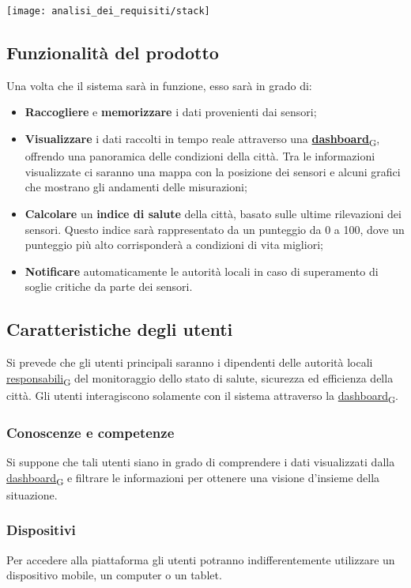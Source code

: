 \begin{center}
	\texttt{[image: analisi\_dei\_requisiti/stack]}
\end{center}

\subsection{Funzionalità del prodotto}
Una volta che il sistema sarà in funzione, esso sarà in grado di:
\begin{itemize}
	\item \textbf{Raccogliere} e \textbf{memorizzare} i dati provenienti dai sensori;
	\item \textbf{Visualizzare} i dati raccolti in tempo reale attraverso una \href{https://7last.github.io/docs/rtb/documentazione-interna/glossario\#dashboard}{\textbf{dashboard}\textsubscript{G}}, offrendo una panoramica delle condizioni della città.
	      Tra le informazioni visualizzate ci saranno una mappa con la posizione dei sensori e alcuni grafici che mostrano gli andamenti delle misurazioni;
	\item \textbf{Calcolare} un \textbf{indice di salute} della città, basato sulle ultime rilevazioni dei sensori. Questo indice sarà rappresentato da un punteggio da 0 a 100, dove un punteggio più alto corrisponderà a condizioni di vita migliori;
	\item \textbf{Notificare} automaticamente le autorità locali in caso di superamento di soglie critiche da parte dei sensori.
\end{itemize}

\subsection{Caratteristiche degli utenti}
Si prevede che gli utenti principali saranno i dipendenti delle autorità locali \href{https://7last.github.io/docs/rtb/documentazione-interna/glossario\#responsabile}{responsabili\textsubscript{G}}
del monitoraggio dello stato di salute, sicurezza ed efficienza della città.
Gli utenti interagiscono solamente con il sistema attraverso la \href{https://7last.github.io/docs/rtb/documentazione-interna/glossario\#dashboard}{dashboard\textsubscript{G}}.

\subsubsection{Conoscenze e competenze}
Si suppone che tali utenti siano in grado di comprendere i dati visualizzati dalla \href{https://7last.github.io/docs/rtb/documentazione-interna/glossario\#dashboard}{dashboard\textsubscript{G}} e filtrare le informazioni
per ottenere una visione d'insieme della situazione.

\subsubsection{Dispositivi}
Per accedere alla piattaforma gli utenti potranno indifferentemente utilizzare un dispositivo mobile, un computer o un tablet.






